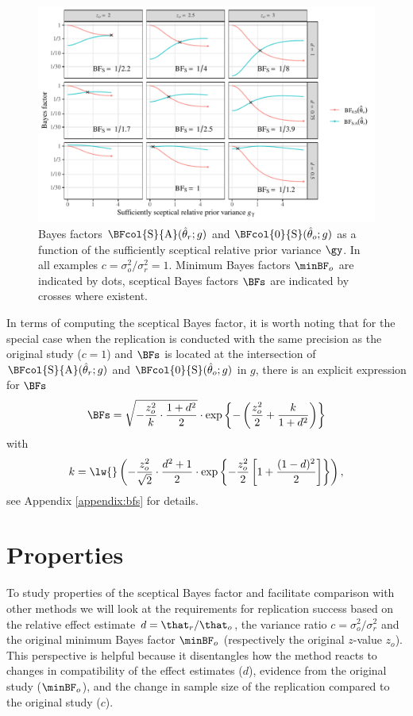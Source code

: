 \begin{figure}[!htb]
\begin{knitrout}
\color{fgcolor}
\includegraphics[width=\maxwidth]{images/paper1/plot-BFs-1}
\end{knitrout}
\caption{Bayes factors $\BFcol{\mathrm{S}}{\mathrm{A}}(\hat{\theta}_r; g)$ and
$\BFcol{0}{\mathrm{S}}(\hat{\theta}_o; g)$ as a function of the sufficiently
sceptical relative prior variance $\gy$. In all examples
$c = \sigma^2_o/\sigma^2_r = 1$. Minimum Bayes factors $\minBF_o$ are indicated
by dots, sceptical Bayes factors $\BFs$ are indicated by crosses where existent.}
\label{fig:bfs}
\end{figure}


In terms of computing the sceptical Bayes factor, it is worth noting that for
the special case when the replication is conducted with the same precision as
the original study ($c = 1$) and $\BFs$ is located at the intersection of
$\BFcol{\mathrm{S}}{\mathrm{A}}(\hat{\theta}_r; g)$ and
$\BFcol{0}{\mathrm{S}}(\hat{\theta}_o; g)$ in $g$, there is an explicit expression
for $\BFs$
\begin{align}
  \label{eq:BFsc1}
  \BFs =
  \sqrt{-\frac{z^2_{o}}{k} \cdot \frac{1 + d^{2}}{2}} \cdot
  \exp\left\{-\left(\frac{z_o^2}{2} + \frac{k}{1 + d^2}\right)\right\}
\end{align}
with
$$k = \lw{}\left(-\frac{z_{o}^{2}}{\sqrt{2}} \cdot \frac{d^{2} + 1}{2} \cdot \exp\left\{-\frac{z_o^2}{2}
  \left[1 + \frac{(1 -
d)^2}{2}\right]\right\}\right),$$ see Appendix \ref{appendix:bfs} for details.


\section{Properties}
\label{sec:comparison}
To study properties of the sceptical Bayes factor and facilitate comparison with
other methods we will look at the requirements for replication success based on
the relative effect estimate $d = \that_{r}/\that_{o}$, the variance ratio
$c = \sigma^{2}_{o}/\sigma^{2}_{r}$ and the original minimum Bayes factor
$\minBF_{o}$ (respectively the original $z$-value $z_{o}$). This perspective is
helpful because it disentangles how the method reacts to changes in
compatibility of the effect estimates ($d$), evidence from the original study
($\minBF_{o}$), and the change in sample size of the replication compared to the
original study ($c$).

